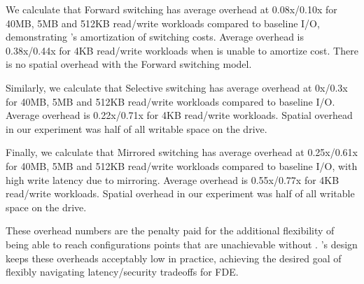 We calculate that Forward switching has average overhead at 0.08x/0.10x for
40MB, 5MB and 512KB read/write workloads compared to baseline I/O, demonstrating
\sys's amortization of switching costs. Average overhead is\\0.38x/0.44x for 4KB
read/write workloads when \sys is unable to amortize cost. There is no spatial
overhead with the Forward switching model.

Similarly, we calculate that Selective switching has average overhead at 0x/0.3x
for 40MB, 5MB and 512KB read/write workloads compared to baseline I/O. Average
overhead is 0.22x/0.71x for 4KB read/write workloads. Spatial overhead in our
experiment was half of all writable space on the drive.

Finally, we calculate that Mirrored switching has average overhead at
0.25x/0.61x for 40MB, 5MB and 512KB read/write workloads compared to baseline
I/O, with high write latency due to mirroring. Average overhead is 0.55x/0.77x
for 4KB read/write workloads. Spatial overhead in our experiment was half of all
writable space on the drive.

These overhead numbers are the penalty paid for the additional flexibility of
being able to reach configurations points that are unachievable without \sys.
\sys's design keeps these overheads acceptably low in practice, achieving the
desired goal of flexibly navigating latency/security tradeoffs for FDE.
